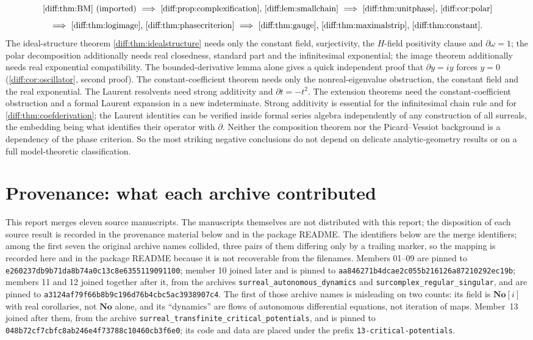 \documentclass[11pt,letterpaper]{article}
\numberwithin{equation}{section}
\theoremstyle{definition}
\theoremstyle{remark}
\newcommand{\No}{\mathbf{No}}
\newcommand{\der}{\partial}
\newcommand{\Commit}{\nolinkurl{e260237db9b71da8b74a0c13c8e6355119091100}}
\newcommand{\CommitB}{\nolinkurl{aa846271b4dcae2c055b216126a87210292ec19b}}
\newcommand{\CommitC}{\nolinkurl{a3124af79f66b8b9c196d76b4cbc5ac3938907c4}}
\newcommand{\CommitD}{\nolinkurl{048b72cf7cbfc8ab246e4f73788c10460cb3f6e0}}
\begin{document}
\[
 \text{\cref{diff:thm:BM} (imported)}
 \ \Longrightarrow\
 \text{\cref{diff:prop:complexification}, \cref{diff:lem:smallchain}}
 \ \Longrightarrow\
 \text{\cref{diff:thm:unitphase}, \cref{diff:cor:polar}}
\]
\[
 \Longrightarrow\
 \text{\cref{diff:thm:logimage}, \cref{diff:thm:phasecriterion}}
 \ \Longrightarrow\
 \text{\cref{diff:thm:gauge}, \cref{diff:thm:maximalstrip},
 \cref{diff:thm:constant}}.
\]
The ideal-structure theorem \cref{diff:thm:idealstructure} needs only the
constant field, surjectivity, the $H$-field positivity clause and
$\der\omega=1$; the polar decomposition additionally needs real closedness,
standard part and the infinitesimal exponential; the image theorem
additionally needs real exponential compatibility. The bounded-derivative
lemma alone gives a quick independent proof that $\der y=iy$ forces $y=0$
(\cref{diff:cor:oscillator}, second proof). The constant-coefficient theorem
needs only the nonreal-eigenvalue obstruction, the constant field and the real
exponential. The Laurent resolvents need strong additivity and $\der t=-t^{2}$.
The extension theorems need the constant-coefficient obstruction and a formal
Laurent expansion in a new indeterminate. Strong additivity is essential for
the infinitesimal chain rule and for
\cref{diff:thm:coefderivation}; the Laurent identities can be verified inside
formal series algebra independently of any construction of all surreals, the
embedding being what identifies their operator with $\der$. Neither the
composition theorem nor the Picard--Vessiot background is a dependency of the
phase criterion. So the most striking negative conclusions do not depend on
delicate analytic-geometry results or on a full model-theoretic
classification.

\section{Provenance: what each archive contributed}
\label{diff:app:provenance}

This report merges eleven source manuscripts. The manuscripts themselves are
not distributed with this report; the disposition of each source result is
recorded in the provenance material below and in the package README. The
identifiers below are the merge identifiers; among the first seven the original archive names collided, three pairs of them
differing only by a trailing marker, so the mapping is recorded here and in the
package README because it is not recoverable from the filenames. Members 01--09
are pinned to \Commit; member 10 joined later and is pinned to \CommitB;
members 11 and 12 joined together after it, from the archives
\texttt{surreal\_autonomous\_dynamics} and
\texttt{surcomplex\_regular\_singular}, and are pinned to \CommitC. The first of
those archive names is misleading on two counts: its field is $\No[i]$ with real
corollaries, not $\No$ alone, and its ``dynamics'' are flows of autonomous
differential equations, not iteration of maps. Member~13 joined after them,
from the archive \texttt{surreal\_transfinite\_critical\_potentials}, and is pinned to
\CommitD; its code and data are placed under the prefix
\texttt{13-critical-potentials}.
\end{document}

